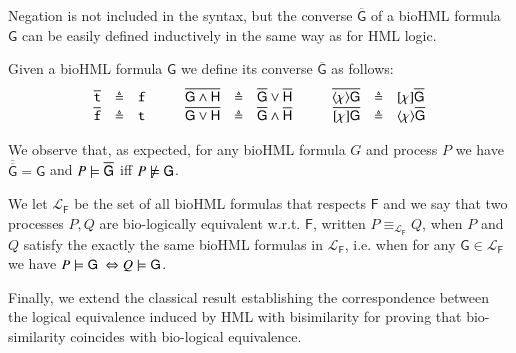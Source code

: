 Negation is not included in the syntax, but the converse $\overline{\mathsf{G}}$ of a bioHML formula $\mathsf{G}$ can be easily defined inductively in the same way as for HML logic.

\begin{definition}[Converse]
Given a bioHML formula $\mathsf{G}$ we define its converse $\overline{\mathsf{G}}$ as follows:
\[
\begin{array}{rcl@{\hspace{1cm}}rcl@{\hspace{1cm}}rcl}
\overline{\tt t} & \defeq & {\tt f} &
\overline{\mathsf{G} \wedge \mathsf{H}} & \defeq & \overline{\mathsf{G}} \vee \overline{\mathsf{H}} &
\overline{\langle \chi \rangle \mathsf{G}} & \defeq & [\chi]\overline{\mathsf{G}}
\\
\overline{\tt f} & \defeq & {\tt t} &
\overline{\mathsf{G} \vee \mathsf{H}} & \defeq & \overline{\mathsf{G}} \wedge \overline{\mathsf{H}} &
\overline{[\chi]\mathsf{G}} & \defeq & \langle \chi \rangle\overline{\mathsf{G}}
\end{array}
\]
\end{definition}

We observe that, as expected, for any bioHML formula $G$ and process $P$ we have $\overline{\overline{\mathsf{G}}} = \mathsf{G}$ and  $P \models \overline{\mathsf{G}}$ iff  $P\not\models \mathsf{G}$.

We let $\mathcal{L}_{\mathsf{F}}$ be the set of all bioHML formulas that respects $\mathsf{F}$ and 
we say that two processes $P,Q$ are bio-logically equivalent w.r.t. $\mathsf{F}$, written $P \equiv_{\mathcal{L}_{\mathsf{F}}}Q$, when $P$ and $Q$ satisfy the exactly the same bioHML formulas in $\mathcal{L}_{\mathsf{F}}$, i.e. when for any $\mathsf{G}\in \mathcal{L}_{\mathsf{F}}$ we have $P \entails \mathsf{G}\ \Leftrightarrow Q \entails \mathsf{G}$.

Finally, we extend the classical result establishing the correspondence between the logical equivalence induced by HML with bisimilarity for proving that bio-similarity coincides with bio-logical equivalence.



